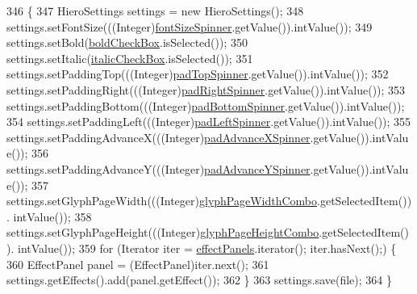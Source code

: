 \begin{DoxyCode}
346                                              \{
347         HieroSettings settings = \textcolor{keyword}{new} HieroSettings();
348         settings.setFontSize(((Integer)\mbox{\hyperlink{classorg_1_1newdawn_1_1slick_1_1tools_1_1hiero_1_1_hiero_ad5c1f797cd6441f6df9618124e3d6d77}{fontSizeSpinner}}.getValue()).intValue());
349         settings.setBold(\mbox{\hyperlink{classorg_1_1newdawn_1_1slick_1_1tools_1_1hiero_1_1_hiero_a605e35729a7fd5437c5fa9692cd44c74}{boldCheckBox}}.isSelected());
350         settings.setItalic(\mbox{\hyperlink{classorg_1_1newdawn_1_1slick_1_1tools_1_1hiero_1_1_hiero_a4c571b425b96934d5298ae39b155db87}{italicCheckBox}}.isSelected());
351         settings.setPaddingTop(((Integer)\mbox{\hyperlink{classorg_1_1newdawn_1_1slick_1_1tools_1_1hiero_1_1_hiero_a10d07901d4b2d2729d228eb329ff873a}{padTopSpinner}}.getValue()).intValue());
352         settings.setPaddingRight(((Integer)\mbox{\hyperlink{classorg_1_1newdawn_1_1slick_1_1tools_1_1hiero_1_1_hiero_a2c0741d232f9cd9054bdb82cc9d0c8b3}{padRightSpinner}}.getValue()).intValue());
353         settings.setPaddingBottom(((Integer)\mbox{\hyperlink{classorg_1_1newdawn_1_1slick_1_1tools_1_1hiero_1_1_hiero_ad1d65973a4b07eaa6b4e8f6638fa6d1b}{padBottomSpinner}}.getValue()).intValue());
354         settings.setPaddingLeft(((Integer)\mbox{\hyperlink{classorg_1_1newdawn_1_1slick_1_1tools_1_1hiero_1_1_hiero_a2396ca8d40bd31d5ccafc3bfa683eb6d}{padLeftSpinner}}.getValue()).intValue());
355         settings.setPaddingAdvanceX(((Integer)\mbox{\hyperlink{classorg_1_1newdawn_1_1slick_1_1tools_1_1hiero_1_1_hiero_afd022869253bd23ee0daf1f0f06966ae}{padAdvanceXSpinner}}.getValue()).intValue());
356         settings.setPaddingAdvanceY(((Integer)\mbox{\hyperlink{classorg_1_1newdawn_1_1slick_1_1tools_1_1hiero_1_1_hiero_a5d9233b804a0a3506880e5ff43dddcad}{padAdvanceYSpinner}}.getValue()).intValue());
357         settings.setGlyphPageWidth(((Integer)\mbox{\hyperlink{classorg_1_1newdawn_1_1slick_1_1tools_1_1hiero_1_1_hiero_a27e8ebe1ca05ea8252bf38dc2bb73b02}{glyphPageWidthCombo}}.getSelectedItem()).
      intValue());
358         settings.setGlyphPageHeight(((Integer)\mbox{\hyperlink{classorg_1_1newdawn_1_1slick_1_1tools_1_1hiero_1_1_hiero_af25be89f1cd46381e5e6fc93a02de118}{glyphPageHeightCombo}}.getSelectedItem()).
      intValue());
359         \textcolor{keywordflow}{for} (Iterator iter = \mbox{\hyperlink{classorg_1_1newdawn_1_1slick_1_1tools_1_1hiero_1_1_hiero_a84dc85d78d9ad7b44e24e045b0a0cd84}{effectPanels}}.iterator(); iter.hasNext();) \{
360             EffectPanel panel = (EffectPanel)iter.next();
361             settings.getEffects().add(panel.getEffect());
362         \}
363         settings.save(file);
364     \}
\end{DoxyCode}
\mbox{\label{classorg_1_1newdawn_1_1slick_1_1tools_1_1hiero_1_1_hiero_aaee4b931c33090913c970c8484c90af7}} 
